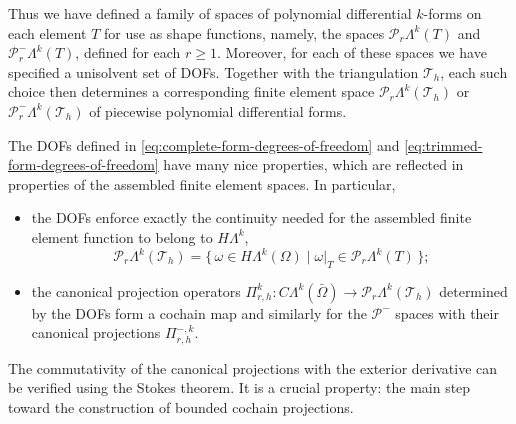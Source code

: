 {Thus we have defined a family of spaces of polynomial differential $k$-forms on each element $T$ for use as shape functions, namely, the spaces $\mathcal P_r\Lambda^k(T)$ and $\mathcal P_r^-\Lambda^k(T)$, defined for each $r\geq1$. Moreover, for each of these spaces we have specified a unisolvent set of DOFs. Together with the triangulation $\mathcal T_h$, each such choice then determines a corresponding finite element space $\mathcal P_r\Lambda^k(\mathcal T_h)$ or $\mathcal P_r^-\Lambda^k(\mathcal T_h)$ of piecewise polynomial differential forms.}

{The DOFs defined in \eqref{eq:complete-form-degrees-of-freedom} and \eqref{eq:trimmed-form-degrees-of-freedom} have many nice properties, which are reflected in properties of the assembled finite element spaces. In particular,}
\begin{itemize}
\item{the DOFs enforce exactly the continuity needed for the assembled finite element function to belong to $H\Lambda^k$,}
\[
\mathcal P_r\Lambda^k(\mathcal T_h)=\{\,\omega\in H\Lambda^k(\Omega)\mid\omega|_T\in\mathcal P_r\Lambda^k(T)\,\};
\]
\item{the canonical projection operators $\Pi_{r,h}^k:C\Lambda^k(\bar\Omega)\to\mathcal P_r\Lambda^k(\mathcal T_h)$ determined by the DOFs form a cochain map and similarly for the $\mathcal P^-$ spaces with their canonical projections $\Pi_{r,h}^{-,k}$.}
\end{itemize}

{The commutativity of the canonical projections with the exterior derivative can be verified using the Stokes theorem. It is a crucial property: the main step toward the construction of bounded cochain projections.}
